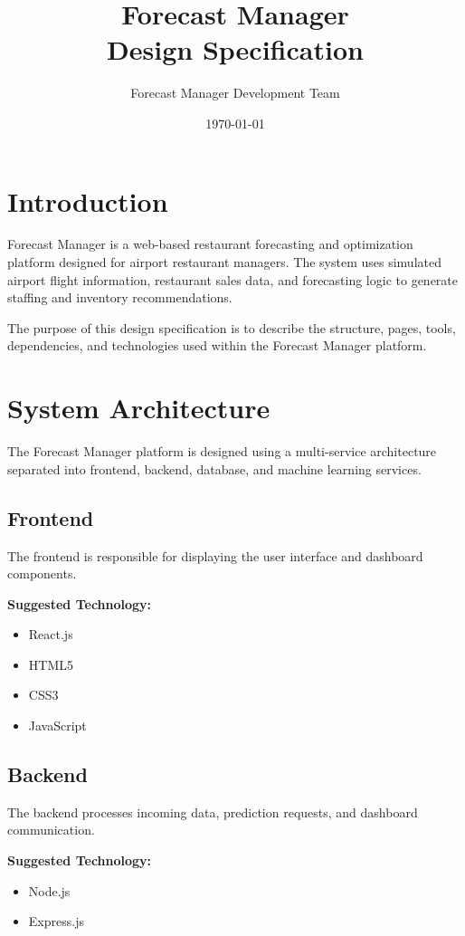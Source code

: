 \documentclass[12pt]{article}
\title{Forecast Manager\\Design Specification}
\author{Forecast Manager Development Team}
\date{\today}
\begin{document}
\maketitle
\tableofcontents
\newpage

\section{Introduction}

Forecast Manager is a web-based restaurant forecasting and optimization platform designed for airport restaurant managers. The system uses simulated airport flight information, restaurant sales data, and forecasting logic to generate staffing and inventory recommendations.

The purpose of this design specification is to describe the structure, pages, tools, dependencies, and technologies used within the Forecast Manager platform.

\section{System Architecture}

The Forecast Manager platform is designed using a multi-service architecture separated into frontend, backend, database, and machine learning services.

\subsection{Frontend}
The frontend is responsible for displaying the user interface and dashboard components.

\textbf{Suggested Technology:}
\begin{itemize}
\item React.js
\item HTML5
\item CSS3
\item JavaScript
\end{itemize}

\subsection{Backend}
The backend processes incoming data, prediction requests, and dashboard communication.

\textbf{Suggested Technology:}
\begin{itemize}
\item Node.js
\item Express.js
\end{itemize}
\end{document}
